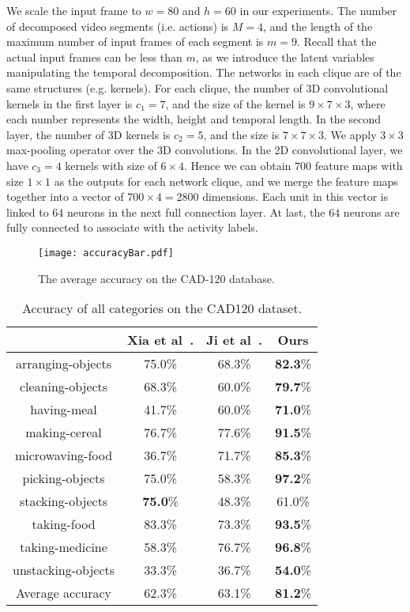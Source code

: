 \documentclass{sig-alternate}
\begin{document}
We scale the input frame to $w = 80$ and $h = 60$ in our experiments. The number of decomposed video segments (i.e. actions) is $M=4$, and the length of the maximum number of input frames of each segment is $m=9$. Recall that the actual input frames can be less than $m$, as we introduce the latent variables manipulating the temporal decomposition. The networks in each clique are of the same structures (e.g. kernels). For each clique, the number of 3D convolutional kernels in the first layer is $c_1=7$, and the size of the kernel is $9 \times 7 \times 3$, where each number represents the width, height and temporal length. In the second layer, the number of 3D kernels is $c_2=5$, and the size is $7 \times 7 \times 3$. We apply $3 \times 3$ max-pooling operator over the 3D convolutions. In the 2D convolutional layer, we have $c_3=4$ kernels with size of $6 \times 4$. Hence we can obtain $700$ feature maps with size $1 \times 1$ as the outputs for each network clique, and we merge the feature maps  together into a vector of $700 \times 4 = 2800$ dimensions. Each unit in this vector is linked to $64$ neurons in the next full connection layer. At last, the $64$ neurons are fully connected to associate with the activity labels.

\begin{figure}[!htb]
\centering
\texttt{[image: accuracyBar.pdf]}
\caption{The average accuracy on the CAD-120 database.}\label{fig:CAD_results}
\end{figure}

\begin{table}[!htbp]
\center
\begin{tabular}{|c|c|c|c|}
\hline
\hline
& Xia et al~\cite{DSTIP}. & Ji et al~\cite{3DCNNPAMI}. & Ours \\
\hline
\hline
arranging-objects & 75.0\% & 68.3\% & \textbf{82.3}\% \\
cleaning-objects & 68.3\%  & 60.0\% & \textbf{79.7}\% \\
having-meal & 41.7\%  & 60.0\% & \textbf{71.0}\% \\
making-cereal & 76.7\% & 77.6\% & \textbf{91.5}\% \\
microwaving-food &  36.7\% & 71.7\% & \textbf{85.3}\% \\
picking-objects & 75.0\% & 58.3\% & \textbf{97.2}\% \\
stacking-objects & \textbf{75.0}\% & 48.3\% & 61.0\% \\
taking-food & 83.3\% & 73.3\% & \textbf{93.5}\% \\
taking-medicine & 58.3\%  & 76.7\% & \textbf{96.8}\% \\
unstacking-objects & 33.3\% & 36.7\% & \textbf{54.0}\% \\
\hline
\hline
Average accuracy  & 62.3\% & 63.1\% & \textbf{81.2}\% \\
\hline
\end{tabular}
\caption{Accuracy of all categories on the CAD120 dataset. }
\label{tab:cad120}
\end{table}
\end{document}
